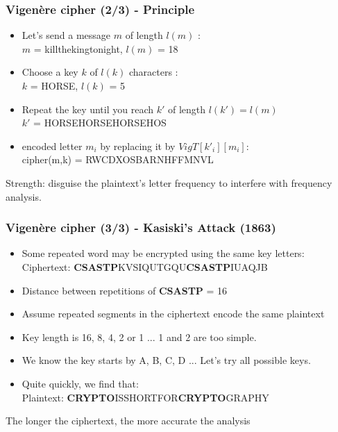 \documentclass[
hyperref={pdfpagelabels=false}
,xcolor=table
]
{beamer}
\begin{document}
\begin{frame}
  \frametitle{Vigenère cipher (2/3) - Principle}
  \begin{itemize}
  \item Let's send a message $m$ of length $l(m)$ : \\
    \alert{$m$ = killthekingtonight, $l(m)$ = 18}
    \item Choose a key $k$ of $l(k)$ characters : \\
      \alert{$k$ = HORSE, $l(k)$ = 5}
    \item Repeat the key until you reach $k'$ of length $l(k') = l(m)$ \\
      \alert{$k'$ = HORSEHORSEHORSEHOS}
    \item encoded letter $m_i$ by replacing it by $VigT[k'_i][m_i]$: \\
      \alert{cipher(m,k) = RWCDXOSBARNHFFMNVL}
    \end{itemize}

    \bigskip
    
    Strength: disguise the plaintext's letter frequency to interfere with frequency analysis.
\end{frame}


\begin{frame}
  \frametitle{Vigenère cipher (3/3) - Kasiski's Attack (1863)}
  \begin{itemize}
  \item Some repeated word may be encrypted using the same key letters:\\
    Ciphertext: \textbf{CSASTP}KVSIQUTGQU\textbf{CSASTP}IUAQJB\\
  \item Distance between repetitions of \textbf{CSASTP} = 16
  \item Assume repeated segments in the ciphertext encode the same plaintext
  \item Key length is 16, 8, 4, 2 or 1 ... 1 and 2 are too simple. 
  \item We know the key starts by A, B, C, D ... Let's try all possible keys.
    
  \item Quite quickly, we find that:\\
    Plaintext:  \textbf{CRYPTO}ISSHORTFOR\textbf{CRYPTO}GRAPHY\\
  \end{itemize}

  \bigskip
  
  The longer the ciphertext, the more accurate the analysis
\end{frame}
\end{document}
